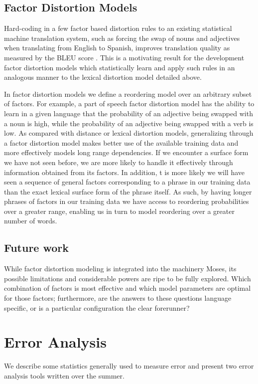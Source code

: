 \documentclass[11pt]{report}
\theoremstyle{plain}
\begin{document}
{\subsection{Factor Distortion Models}
Hard-coding in a few factor based distortion rules to an existing statistical machine translation system, such as forcing the swap of nouns and adjectives when translating from English to Spanish, improves translation quality as measured by the BLEU score \cite{pop:06}. This is a motivating result for the development factor distortion models which statistically learn and apply such rules in an analogous manner to the lexical distortion model detailed above.

In factor distortion models we define a reordering model over an arbitrary subset of factors. For example, a part of speech factor distortion model has the ability to learn in a given language that the probability of an adjective being swapped with a noun is high, while the probability of an adjective being swapped with a verb is low. As compared with distance or lexical distortion models, generalizing through a factor distortion model makes better use of the available training data and more effectively models long range dependencies. If we encounter a surface form we have not seen before, we are more likely to handle it effectively through information obtained from its factors. In addition, t is more likely we will have seen a sequence of general factors corresponding to a phrase in our training data than the exact lexical surface form of the phrase itself. As such, by having longer phrases of factors in our training data we have access to reordering probabilities over a greater range, enabling us in turn to model reordering over a greater number of words.

\subsection{Future work}
While factor distortion modeling is integrated into the machinery Moses, its possible limitations and considerable powers are ripe to be fully explored. Which combination of factors is most effective and which model parameters are optimal for those factors; furthermore, are the answers to these questions language specific, or is a particular configuration the clear forerunner?

\section{Error Analysis}
We describe some statistics generally used to measure error and present two error analysis tools written over the summer.

}
\end{document}

